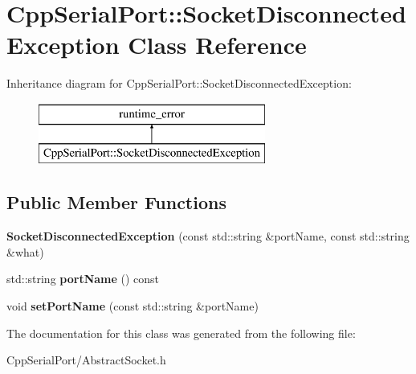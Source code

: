 \hypertarget{class_cpp_serial_port_1_1_socket_disconnected_exception}{}\section{Cpp\+Serial\+Port\+:\+:Socket\+Disconnected\+Exception Class Reference}
\label{class_cpp_serial_port_1_1_socket_disconnected_exception}
Inheritance diagram for Cpp\+Serial\+Port\+:\+:Socket\+Disconnected\+Exception\+:\begin{figure}[H]
\begin{center}
\leavevmode
\includegraphics[height=2.000000cm]{class_cpp_serial_port_1_1_socket_disconnected_exception}
\end{center}
\end{figure}
\subsection*{Public Member Functions}
\begin{DoxyCompactItemize}
\item 
\mbox{\label{class_cpp_serial_port_1_1_socket_disconnected_exception_a720ff500086197ae055279f76715254e}} 
{\bfseries Socket\+Disconnected\+Exception} (const std\+::string \&port\+Name, const std\+::string \&what)
\item 
\mbox{\label{class_cpp_serial_port_1_1_socket_disconnected_exception_aa427a8398db0b5bb33ef5fbbdf83503a}} 
std\+::string {\bfseries port\+Name} () const
\item 
\mbox{\label{class_cpp_serial_port_1_1_socket_disconnected_exception_a8734a849717a23db8ce672ce6b0196c6}} 
void {\bfseries set\+Port\+Name} (const std\+::string \&port\+Name)
\end{DoxyCompactItemize}


The documentation for this class was generated from the following file\+:\begin{DoxyCompactItemize}
\item 
Cpp\+Serial\+Port/Abstract\+Socket.\+h\end{DoxyCompactItemize}
